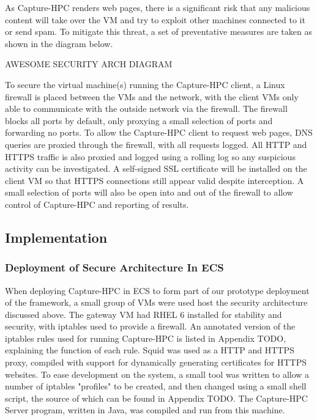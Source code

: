 As Capture-HPC renders web pages, there is a significant risk that any malicious
content will take over the VM and try to exploit other machines connected to it
or send spam. To mitigate this threat, a set of preventative measures are taken
as shown in the diagram below.

AWESOME SECURITY ARCH DIAGRAM

To secure the virtual machine(s) running the Capture-HPC client, a Linux
firewall is placed between the VMs and the network, with the client VMs only
able to communicate with the outside network via the firewall. The firewall
blocks all ports by default, only proxying a small selection of ports and
forwarding no ports. To allow the Capture-HPC client to request web pages, DNS
queries are proxied through the firewall, with all requests logged. All HTTP and
HTTPS traffic is also proxied and logged using a rolling log so any suspicious
activity can be investigated. A self-signed SSL certificate will be installed on
the client VM so that HTTPS connections still appear valid despite interception.
A small selection of ports will also be open into and out of the firewall to
allow control of Capture-HPC and reporting of results.

\subsection{Implementation}

\subsubsection{Deployment of Secure Architecture In ECS}

When deploying Capture-HPC in ECS to form part of our prototype deployment of
the framework, a small group of VMs were used host the security architecture
discussed above. The gateway VM had RHEL 6 installed for stability and security,
with iptables used to provide a firewall. An annotated version of the iptables
rules used for running Capture-HPC is listed in Appendix TODO, explaining the
function of each rule. Squid was used as a HTTP and HTTPS proxy, compiled with
support for dynamically generating certificates for HTTPS websites. To ease 
development on the system, a small tool was written to allow a number of
iptables "profiles" to be created, and then changed using a small shell script,
the source of which can be found in Appendix TODO. The Capture-HPC Server
program, written in Java, was compiled and run from this machine.

